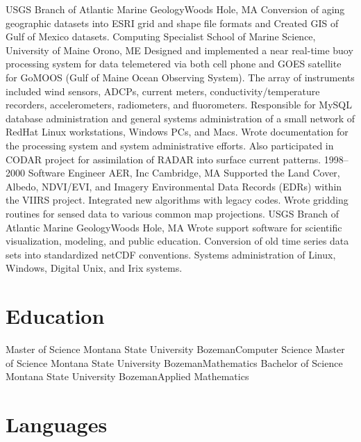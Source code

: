 \documentclass[11pt]{moderncv}  %
\begin{document}
{
	USGS Branch of Atlantic Marine Geology}{Woods Hole, MA}{}{
    Conversion of aging geographic datasets into ESRI grid and shape
    file formats and Created GIS of Gulf of Mexico datasets.
}
{Computing Specialist}
{School of Marine Science, University of Maine}
{Orono, ME}{}
{
    Designed and implemented a near real-time buoy processing system
    for data telemetered via both cell phone and GOES satellite for
    GoMOOS (Gulf of Maine Ocean Observing System).   The array of
    instruments included wind sensors, ADCPs, current meters,
    conductivity/temperature recorders, accelerometers, radiometers,
    and fluorometers.   Responsible for MySQL database administration
    and general systems administration of a small network of RedHat
    Linux workstations, Windows PCs, and Macs.   Wrote documentation
    for the processing system and system administrative efforts.
    Also participated in CODAR project for assimilation of RADAR
    into surface current patterns.
}
\cventry
{1998--2000}
{Software Engineer}
{AER, Inc}
{Cambridge, MA}
{}
{
    Supported the Land Cover, Albedo, NDVI/EVI, and Imagery
    Environmental Data Records (EDRs) within the VIIRS project.
    Integrated new algorithms with legacy codes. Wrote gridding
    routines for sensed data to various common map projections.
}
    {USGS Branch of Atlantic Marine Geology}{Woods Hole, MA}{}{
    Wrote support software for scientific visualization, modeling,
    and public education. Conversion of old time series data sets
    into standardized netCDF conventions.  Systems administration
    of Linux, Windows, Digital Unix, and Irix systems.}

\section{Education}
    {Master of Science}
    {Montana State University}
    {Bozeman}{}{Computer Science}
    {Master of Science}
    {Montana State University}
    {Bozeman}{}{Mathematics}
    {Bachelor of Science}
    {Montana State University}
    {Bozeman}{}{Applied Mathematics}

\section{Languages}
\end{document}
